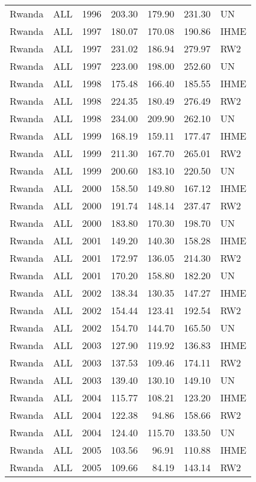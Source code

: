 \begin{longtable}{lllrrrl}
  Rwanda & ALL & 1996 & 203.30 & 179.90 & 231.30 & UN \\ 
  Rwanda & ALL & 1997 & 180.07 & 170.08 & 190.86 & IHME \\ 
  Rwanda & ALL & 1997 & 231.02 & 186.94 & 279.97 & RW2 \\ 
  Rwanda & ALL & 1997 & 223.00 & 198.00 & 252.60 & UN \\ 
  Rwanda & ALL & 1998 & 175.48 & 166.40 & 185.55 & IHME \\ 
  Rwanda & ALL & 1998 & 224.35 & 180.49 & 276.49 & RW2 \\ 
  Rwanda & ALL & 1998 & 234.00 & 209.90 & 262.10 & UN \\ 
  Rwanda & ALL & 1999 & 168.19 & 159.11 & 177.47 & IHME \\ 
  Rwanda & ALL & 1999 & 211.30 & 167.70 & 265.01 & RW2 \\ 
  Rwanda & ALL & 1999 & 200.60 & 183.10 & 220.50 & UN \\ 
  Rwanda & ALL & 2000 & 158.50 & 149.80 & 167.12 & IHME \\ 
  Rwanda & ALL & 2000 & 191.74 & 148.14 & 237.47 & RW2 \\ 
  Rwanda & ALL & 2000 & 183.80 & 170.30 & 198.70 & UN \\ 
  Rwanda & ALL & 2001 & 149.20 & 140.30 & 158.28 & IHME \\ 
  Rwanda & ALL & 2001 & 172.97 & 136.05 & 214.30 & RW2 \\ 
  Rwanda & ALL & 2001 & 170.20 & 158.80 & 182.20 & UN \\ 
  Rwanda & ALL & 2002 & 138.34 & 130.35 & 147.27 & IHME \\ 
  Rwanda & ALL & 2002 & 154.44 & 123.41 & 192.54 & RW2 \\ 
  Rwanda & ALL & 2002 & 154.70 & 144.70 & 165.50 & UN \\ 
  Rwanda & ALL & 2003 & 127.90 & 119.92 & 136.83 & IHME \\ 
  Rwanda & ALL & 2003 & 137.53 & 109.46 & 174.11 & RW2 \\ 
  Rwanda & ALL & 2003 & 139.40 & 130.10 & 149.10 & UN \\ 
  Rwanda & ALL & 2004 & 115.77 & 108.21 & 123.20 & IHME \\ 
  Rwanda & ALL & 2004 & 122.38 & 94.86 & 158.66 & RW2 \\ 
  Rwanda & ALL & 2004 & 124.40 & 115.70 & 133.50 & UN \\ 
  Rwanda & ALL & 2005 & 103.56 & 96.91 & 110.88 & IHME \\ 
  Rwanda & ALL & 2005 & 109.66 & 84.19 & 143.14 & RW2 \\ 

\end{longtable}
